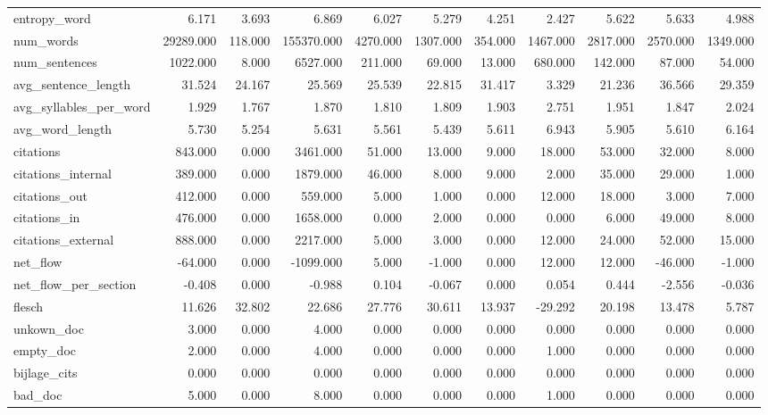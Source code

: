 \begin{tabular}{lrrrrrrrrrr}
\cline{1-11}
entropy\_word & 6.171 & 3.693 & 6.869 & 6.027 & 5.279 & 4.251 & 2.427 & 5.622 & 5.633 & 4.988 \\
\cline{1-11}
num\_words & 29289.000 & 118.000 & 155370.000 & 4270.000 & 1307.000 & 354.000 & 1467.000 & 2817.000 & 2570.000 & 1349.000 \\
\cline{1-11}
num\_sentences & 1022.000 & 8.000 & 6527.000 & 211.000 & 69.000 & 13.000 & 680.000 & 142.000 & 87.000 & 54.000 \\
\cline{1-11}
avg\_sentence\_length & 31.524 & 24.167 & 25.569 & 25.539 & 22.815 & 31.417 & 3.329 & 21.236 & 36.566 & 29.359 \\
\cline{1-11}
avg\_syllables\_per\_word & 1.929 & 1.767 & 1.870 & 1.810 & 1.809 & 1.903 & 2.751 & 1.951 & 1.847 & 2.024 \\
\cline{1-11}
avg\_word\_length & 5.730 & 5.254 & 5.631 & 5.561 & 5.439 & 5.611 & 6.943 & 5.905 & 5.610 & 6.164 \\
\cline{1-11}
citations & 843.000 & 0.000 & 3461.000 & 51.000 & 13.000 & 9.000 & 18.000 & 53.000 & 32.000 & 8.000 \\
\cline{1-11}
citations\_internal & 389.000 & 0.000 & 1879.000 & 46.000 & 8.000 & 9.000 & 2.000 & 35.000 & 29.000 & 1.000 \\
\cline{1-11}
citations\_out & 412.000 & 0.000 & 559.000 & 5.000 & 1.000 & 0.000 & 12.000 & 18.000 & 3.000 & 7.000 \\
\cline{1-11}
citations\_in & 476.000 & 0.000 & 1658.000 & 0.000 & 2.000 & 0.000 & 0.000 & 6.000 & 49.000 & 8.000 \\
\cline{1-11}
citations\_external & 888.000 & 0.000 & 2217.000 & 5.000 & 3.000 & 0.000 & 12.000 & 24.000 & 52.000 & 15.000 \\
\cline{1-11}
net\_flow & -64.000 & 0.000 & -1099.000 & 5.000 & -1.000 & 0.000 & 12.000 & 12.000 & -46.000 & -1.000 \\
\cline{1-11}
net\_flow\_per\_section & -0.408 & 0.000 & -0.988 & 0.104 & -0.067 & 0.000 & 0.054 & 0.444 & -2.556 & -0.036 \\
\cline{1-11}
flesch & 11.626 & 32.802 & 22.686 & 27.776 & 30.611 & 13.937 & -29.292 & 20.198 & 13.478 & 5.787 \\
\cline{1-11}
unkown\_doc & 3.000 & 0.000 & 4.000 & 0.000 & 0.000 & 0.000 & 0.000 & 0.000 & 0.000 & 0.000 \\
\cline{1-11}
empty\_doc & 2.000 & 0.000 & 4.000 & 0.000 & 0.000 & 0.000 & 1.000 & 0.000 & 0.000 & 0.000 \\
\cline{1-11}
bijlage\_cits & 0.000 & 0.000 & 0.000 & 0.000 & 0.000 & 0.000 & 0.000 & 0.000 & 0.000 & 0.000 \\
\cline{1-11}
bad\_doc & 5.000 & 0.000 & 8.000 & 0.000 & 0.000 & 0.000 & 1.000 & 0.000 & 0.000 & 0.000 \\
\cline{1-11}
\bottomrule
\end{tabular}
